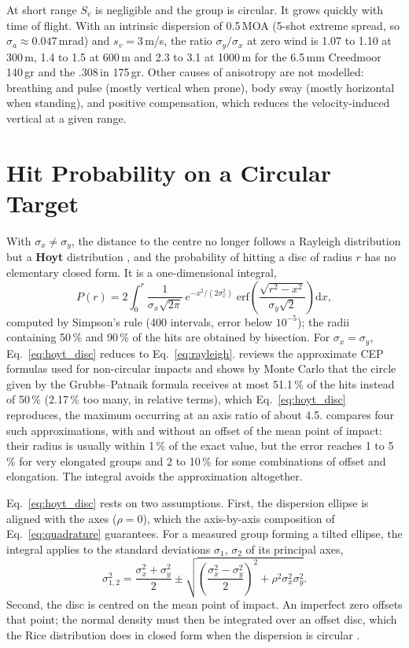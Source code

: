 \documentclass[11pt,twoside,openright]{report}
\begin{document}
At short range $S_v$ is negligible and the group is circular. It grows quickly with time of flight. With an intrinsic dispersion of 0.5\,MOA (5-shot extreme spread, so $\sigma_a \approx 0.047$\,mrad) and $s_v = 3$\,m/s, the ratio $\sigma_y/\sigma_x$ at zero wind is 1.07 to 1.10 at 300\,m, 1.4 to 1.5 at 600\,m and 2.3 to 3.1 at 1000\,m for the 6.5\,mm Creedmoor 140\,gr and the .308\,in 175\,gr. Other causes of anisotropy are not modelled: breathing and pulse (mostly vertical when prone), body sway (mostly horizontal when standing), and positive compensation, which reduces the velocity-induced vertical at a given range.

\section{Hit Probability on a Circular Target}

With $\sigma_x \neq \sigma_y$, the distance to the centre no longer follows a Rayleigh distribution but a \textbf{Hoyt} distribution \citep{ballistipedia_cep}, and the probability of hitting a disc of radius $r$ has no elementary closed form. It is a one-dimensional integral,
\begin{equation}
  P(r) = 2\int_0^{r} \frac{1}{\sigma_x\sqrt{2\pi}}\,e^{-x^2/(2\sigma_x^2)}\;
         \mathrm{erf}\!\left(\frac{\sqrt{r^2 - x^2}}{\sigma_y\sqrt{2}}\right)\mathrm{d}x,
  \label{eq:hoyt_disc}
\end{equation}
computed by Simpson's rule (400 intervals, error below $10^{-5}$); the radii containing 50\,\% and 90\,\% of the hits are obtained by bisection. For $\sigma_x = \sigma_y$, Eq.~\eqref{eq:hoyt_disc} reduces to Eq.~\eqref{eq:rayleigh}. \citet{webb2012cep} reviews the approximate CEP formulas used for non-circular impacts and shows by Monte Carlo that the circle given by the Grubbs--Patnaik formula receives at most 51.1\,\% of the hits instead of 50\,\% (2.17\,\% too many, in relative terms), which Eq.~\eqref{eq:hoyt_disc} reproduces, the maximum occurring at an axis ratio of about 4.5. \citet{elder1986cep} compares four such approximations, with and without an offset of the mean point of impact: their radius is usually within 1\,\% of the exact value, but the error reaches 1 to 5\,\% for very elongated groups and 2 to 10\,\% for some combinations of offset and elongation. The integral avoids the approximation altogether.

Eq.~\eqref{eq:hoyt_disc} rests on two assumptions. First, the dispersion ellipse is aligned with the axes ($\rho = 0$), which the axis-by-axis composition of Eq.~\eqref{eq:quadrature} guarantees. For a measured group forming a tilted ellipse, the integral applies to the standard deviations $\sigma_1$, $\sigma_2$ of its principal axes,
\begin{equation}
  \sigma_{1,2}^2 = \frac{\sigma_x^2 + \sigma_y^2}{2} \pm \sqrt{\left(\frac{\sigma_x^2 - \sigma_y^2}{2}\right)^2 + \rho^2\sigma_x^2\sigma_y^2}.
\end{equation}
Second, the disc is centred on the mean point of impact. An imperfect zero offsets that point; the normal density must then be integrated over an offset disc, which the Rice distribution does in closed form when the dispersion is circular \citep{ballistipedia_cep}.
\end{document}

